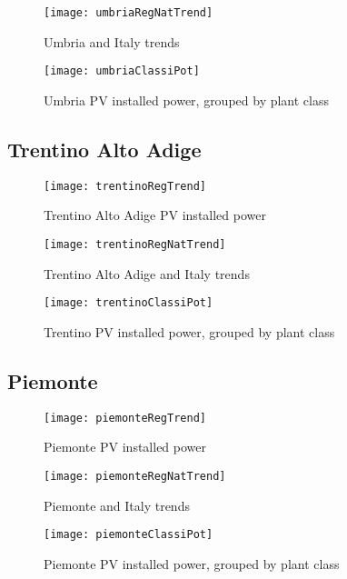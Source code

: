 \documentclass[12pt,a4paper,openright,twoside]{report}
\begin{document}
\begin{figure}[hp]
	\centering
	\texttt{[image: umbriaRegNatTrend]}
	\caption{Umbria and Italy trends}
	\label{umbriaRegNatTrend}
\end{figure}

\begin{figure}[hp]
	\centering
	\texttt{[image: umbriaClassiPot]}
	\caption{Umbria PV installed power, grouped by plant class}
	\label{umbriaClassiPot}
\end{figure}

\subsection*{Trentino Alto Adige}

\begin{figure}[hp]
	\centering
	\texttt{[image: trentinoRegTrend]}
	\caption{Trentino Alto Adige PV installed power}
	\label{trentinoRegTrend}
\end{figure}

\begin{figure}[hp]
	\centering
	\texttt{[image: trentinoRegNatTrend]}
	\caption{Trentino Alto Adige and Italy trends}
	\label{trentinoRegNatTrend}
\end{figure}

\begin{figure}[hp]
	\centering
	\texttt{[image: trentinoClassiPot]}
	\caption{Trentino PV installed power, grouped by plant class}
	\label{trentinoClassiPot}
\end{figure}

\subsection*{Piemonte}

\begin{figure}[hp]
	\centering
	\texttt{[image: piemonteRegTrend]}
	\caption{Piemonte PV installed power}
	\label{piemonteRegTrend}
\end{figure}

\begin{figure}[hp]
	\centering
	\texttt{[image: piemonteRegNatTrend]}
	\caption{Piemonte and Italy trends}
	\label{piemonteRegNatTrend}
\end{figure}

\begin{figure}[hp]
	\centering
	\texttt{[image: piemonteClassiPot]}
	\caption{Piemonte PV installed power, grouped by plant class}
	\label{piemonteClassiPot}
\end{figure}
\end{document}
